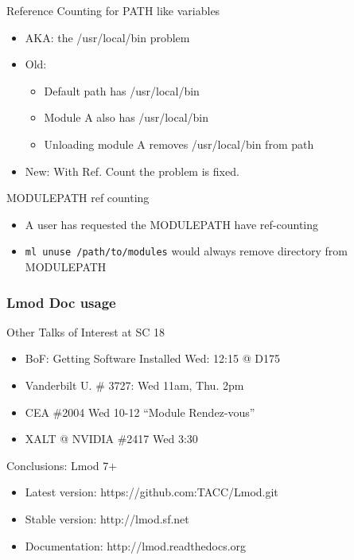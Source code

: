 \documentclass{beamer}
\begin{document}
\begin{frame}{Reference Counting for PATH like variables}
  \begin{itemize}
    \item AKA: the /usr/local/bin problem
    \item Old:
      \begin{itemize}
        \item Default path has /usr/local/bin
        \item Module A also has /usr/local/bin
        \item Unloading module A removes /usr/local/bin from path
      \end{itemize}
    \item New: With Ref. Count the problem is fixed.
  \end{itemize}
\end{frame}

\begin{frame}{MODULEPATH ref counting}
  \begin{itemize}
    \item A user has requested the MODULEPATH have ref-counting
    \item \texttt{ml unuse /path/to/modules} would always remove
      directory from MODULEPATH
  \end{itemize}
\end{frame}

\begin{frame}[fragile]
    \frametitle{Lmod Doc usage}
\end{frame}


\begin{frame}{Other Talks of Interest at SC 18}
  \begin{itemize}
    \item BoF: Getting Software Installed Wed: 12:15 @ D175
    \item Vanderbilt U. \# 3727: Wed 11am, Thu. 2pm
    \item CEA \#2004 Wed 10-12 ``Module Rendez-vous''
    \item XALT @ NVIDIA \#2417 Wed 3:30
  \end{itemize}
\end{frame}

\begin{frame}{Conclusions: Lmod 7+}
  \begin{itemize}
    \item Latest version: https://github.com:TACC/Lmod.git
    \item Stable version: http://lmod.sf.net
    \item Documentation:  http://lmod.readthedocs.org
  \end{itemize}
\end{frame}
\end{document}
